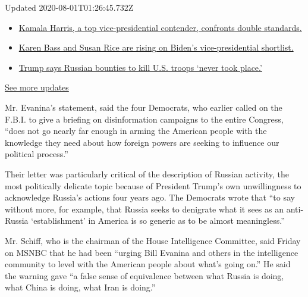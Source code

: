 Updated 2020-08-01T01:26:45.732Z

\begin{itemize}
\tightlist
\item
  \href{https://www.nytimes.com/2020/07/31/us/elections/biden-vs-trump.html?action=click\&pgtype=Article\&state=default\&region=MAIN_CONTENT_1\&context=storylines_live_updates\#link-29fdff45}{Kamala
  Harris, a top vice-presidential contender, confronts double
  standards.}
\item
  \href{https://www.nytimes.com/2020/07/31/us/elections/biden-vs-trump.html?action=click\&pgtype=Article\&state=default\&region=MAIN_CONTENT_1\&context=storylines_live_updates\#link-13ec3d9c}{Karen
  Bass and Susan Rice are rising on Biden's vice-presidential
  shortlist.}
\item
  \href{https://www.nytimes.com/2020/07/31/us/elections/biden-vs-trump.html?action=click\&pgtype=Article\&state=default\&region=MAIN_CONTENT_1\&context=storylines_live_updates\#link-49e9a016}{Trump
  says Russian bounties to kill U.S. troops `never took place.'}
\end{itemize}

\href{https://www.nytimes.com/2020/07/31/us/elections/biden-vs-trump.html?action=click\&pgtype=Article\&state=default\&region=MAIN_CONTENT_1\&context=storylines_live_updates}{See
more updates}

Mr. Evanina's statement, said the four Democrats, who earlier called on
the F.B.I. to give a briefing on disinformation campaigns to the entire
Congress, ``does not go nearly far enough in arming the American people
with the knowledge they need about how foreign powers are seeking to
influence our political process.''

Their letter was particularly critical of the description of Russian
activity, the most politically delicate topic because of President
Trump's own unwillingness to acknowledge Russia's actions four years
ago. The Democrats wrote that ``to say without more, for example, that
Russia seeks to denigrate what it sees as an anti-Russia `establishment'
in America is so generic as to be almost meaningless.''

Mr. Schiff, who is the chairman of the House Intelligence Committee,
said Friday on MSNBC that he had been ``urging Bill Evanina and others
in the intelligence community to level with the American people about
what's going on.'' He said the warning gave ``a false sense of
equivalence between what Russia is doing, what China is doing, what Iran
is doing.''

